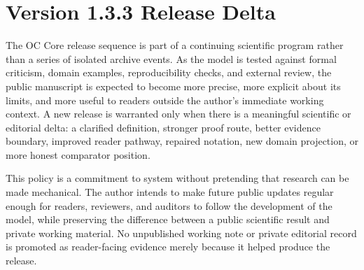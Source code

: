 \begin{abstract}
The manuscript contains the full monograph body, a compact article route, a
methods and reproducibility route, reviewer-response material, proof and
formalization sections, finite-model and numerical evidence anchors, figure and
table material, source-trace appendices, and practical-use boundaries. Figures
and tables are retained as scientific material; formulas and theorem statements
are retained in the mathematical spine; machine-readable registers remain in
the evidence package where they can be audited without becoming the narrative
structure of the manuscript.

The practical value of the release is a disciplined compression without loss of
meaning. If OC is useful, it should help a scientific reviewer, a systems
theorist, an AI builder, an enterprise architect, or an evidence auditor
translate a complex system into a common ontology while preserving the
differences that matter. The principal limitation is part of the method:
future releases must add evidence, mechanization, comparator work, or domain
validation before they widen the public claim surface. Version~1.3.3 therefore
offers a publication-grade basis for external review, not a claim that every
future scientific obligation has already been discharged.
\end{abstract}

\clearpage
\section*{Version 1.3.3 Release Delta}
The OC Core release sequence is part of a continuing scientific program rather
than a series of isolated archive events. As the model is tested against formal
criticism, domain examples, reproducibility checks, and external review, the
public manuscript is expected to become more precise, more explicit about its
limits, and more useful to readers outside the author's immediate working
context. A new release is warranted only when there is a meaningful scientific
or editorial delta: a clarified definition, stronger proof route, better
evidence boundary, improved reader pathway, repaired notation, new domain
projection, or more honest comparator position.

This policy is a commitment to system without pretending that research can be
made mechanical. The author intends to make future public updates regular
enough for readers, reviewers, and auditors to follow the development of the
model, while preserving the difference between a public scientific result and
private working material. No unpublished working note or private editorial
record is promoted as reader-facing evidence merely because it
helped produce the release.

